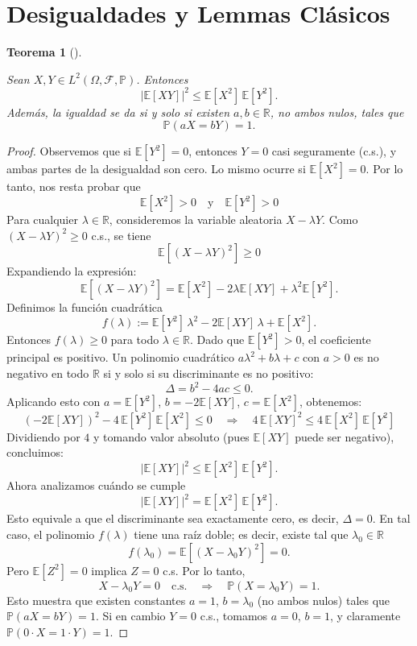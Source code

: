 \documentclass[
  spanish,
  us-letterpaper,
]{scrreprt}
\theoremstyle{plain}
\newtheorem{theorem}{Teorema}[chapter]
\theoremstyle{plain}
\theoremstyle{definition}
\theoremstyle{remark}
\begin{document}
\section{Desigualdades y Lemmas
Clásicos}\label{desigualdades-y-lemmas-cluxe1sicos}

\begin{theorem}[]\protect\hypertarget{thm-des_Cauchy_Sch}{}\label{thm-des_Cauchy_Sch}

Sean \(X, Y \in L^2(\Omega, \mathcal{F}, \mathbb{P})\). Entonces
\[\bigl| \mathbb{E}[XY] \bigr|^2 \leq \mathbb{E}[X^2] \, \mathbb{E}[Y^2].\]
Además, la igualdad se da si y solo si existen \(a, b \in \mathbb{R}\),
no ambos nulos, tales que \[\mathbb{P}(aX = bY) = 1.\]

\end{theorem}

\begin{proof}
Observemos que si \(\mathbb{E}[Y^2] = 0\), entonces \(Y = 0\) casi
seguramente (c.s.), y ambas partes de la desigualdad son cero. Lo mismo
ocurre si \(\mathbb{E}[X^2] = 0\). Por lo tanto, nos resta probar que
\[\mathbb{E}[X^2] > 0 \quad \text{y} \quad \mathbb{E}[Y^2] > 0\] Para
cualquier \(\lambda \in \mathbb{R}\), consideremos la variable aleatoria
\(X - \lambda Y\). Como \((X - \lambda Y)^2 \geq 0\) c.s., se tiene
\[\mathbb{E}[(X - \lambda Y)^2] \geq 0\] Expandiendo la expresión:
\[\mathbb{E}[(X - \lambda Y)^2] = \mathbb{E}[X^2] - 2\lambda \mathbb{E}[XY] + \lambda^2 \mathbb{E}[Y^2].\]
Definimos la función cuadrática
\[f(\lambda) := \mathbb{E}[Y^2]\,\lambda^2 - 2\mathbb{E}[XY]\,\lambda + \mathbb{E}[X^2].\]
Entonces \(f(\lambda) \geq 0\) para todo \(\lambda \in \mathbb{R}\).
Dado que \(\mathbb{E}[Y^2] > 0\), el coeficiente principal es positivo.
Un polinomio cuadrático \(a\lambda^2 + b\lambda + c\) con \(a > 0\) es
no negativo en todo \(\mathbb{R}\) si y solo si su discriminante es no
positivo: \[\Delta = b^2 - 4ac \leq 0.\] Aplicando esto con
\(a = \mathbb{E}[Y^2]\), \(b = -2\mathbb{E}[XY]\),
\(c = \mathbb{E}[X^2]\), obtenemos:
\[(-2\mathbb{E}[XY])^2 - 4\,\mathbb{E}[Y^2]\,\mathbb{E}[X^2] \leq 0
\quad \Longrightarrow \quad
4\,\mathbb{E}[XY]^2 \leq 4\,\mathbb{E}[X^2]\,\mathbb{E}[Y^2]\]
Dividiendo por \(4\) y tomando valor absoluto (pues \(\mathbb{E}[XY]\)
puede ser negativo), concluimos:
\[\bigl| \mathbb{E}[XY] \bigr|^2 \leq \mathbb{E}[X^2] \, \mathbb{E}[Y^2].\]
Ahora analizamos cuándo se cumple
\[\bigl| \mathbb{E}[XY] \bigr|^2 = \mathbb{E}[X^2] \, \mathbb{E}[Y^2].\]
Esto equivale a que el discriminante sea exactamente cero, es decir,
\(\Delta = 0\). En tal caso, el polinomio \(f(\lambda)\) tiene una raíz
doble; es decir, existe tal que \(\lambda_0 \in \mathbb{R}\)
\[f(\lambda_0) = \mathbb{E}[(X - \lambda_0 Y)^2] = 0.\] Pero
\(\mathbb{E}[Z^2] = 0\) implica \(Z = 0\) c.s. Por lo tanto,
\[ X - \lambda_0 Y = 0 \quad \text{c.s.} \quad \Longrightarrow \quad \mathbb{P}(X = \lambda_0 Y) = 1.\]
Esto muestra que existen constantes \(a = 1\), \(b = \lambda_0\) (no
ambos nulos) tales que \(\mathbb{P}(aX = bY) = 1\). Si en cambio
\(Y = 0\) c.s., tomamos \(a = 0\), \(b = 1\), y claramente
\(\mathbb{P}(0 \cdot X = 1 \cdot Y) = 1\).


\end{proof}
\end{document}
